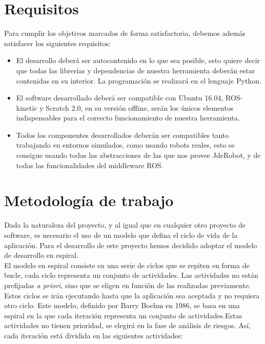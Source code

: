 \section{Requisitos}
\label{sec:requisitos}

Para cumplir los objetivos marcados de forma satisfactoria, debemos además satisfacer
los siguientes requisitos:

\begin{itemize}
\item El desarrollo deberá ser autocontenido en lo que sea posible, esto quiere decir que todas las librerías y dependencias de nuestra herramienta deberán estar contenidas en su interior. La programación se realizará en el
lenguaje Python.
\item El software desarrollado deberá ser compatible con Ubuntu 16.04, ROS-kinetic y Scratch 2.0, en su versión offline, serán los únicos elementos indispensables para el correcto funcionamiento de nuestra herramienta.
\item Todos los componentes desarrollados deberán ser compatibles tanto trabajando en entornos simulados, como usando robots reales, esto se consigue usando todas las abstracciones de las que nos provee JdeRobot, y de todas las funcionalidades del middleware ROS.
\end{itemize}



\section{Metodología de trabajo}
\label{sec:metodologia}

Dada la naturaleza del proyecto, y al igual que en cualquier otro proyecto de software, es necesario el uso de un modelo que defina el ciclo de vida de la aplicación. Para el desarrollo de este proyecto hemos decidido adoptar el modelo de desarrollo en espiral.\\

El modelo en espiral consiste en una serie de ciclos que se repiten en forma de
bucle, cada ciclo representa un conjunto de actividades. Las actividades no están
prefijadas \textit{a priori}, sino que se eligen en función de las realizadas previamente. Estos ciclos se irán ejecutando hasta que la aplicación sea aceptada y no requiera otro
ciclo. Este modelo, definido por Barry Boehm en 1986, se basa en una espiral en la que cada iteración representa un conjunto de actividades.Estas actividades no tienen prioridad, se elegirá en la fase de análisis de riesgos. Así, cada iteración está dividida en las siguientes actividades:


